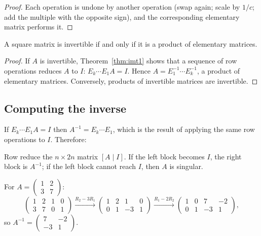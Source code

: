 \begin{proof}
Each operation is undone by another operation (swap again; scale by $1/c$; add the multiple with the opposite sign), and the corresponding elementary matrix performs it.
\end{proof}

\begin{theorem}[Invertible = product of elementary matrices]\label{thm:elemprod}
A square matrix is invertible if and only if it is a product of elementary matrices.
\end{theorem}

\begin{proof}
If $A$ is invertible, Theorem~\ref{thm:imt1} shows that a sequence of row operations reduces $A$ to $I$: $E_k\cdots E_1A=I$. Hence $A=E_1^{-1}\cdots E_k^{-1}$, a product of elementary matrices. Conversely, products of invertible matrices are invertible.
\end{proof}

\subsection*{Computing the inverse}

If $E_k\cdots E_1A=I$ then $A^{-1}=E_k\cdots E_1$, which is the result of applying the same row operations to $I$. Therefore:

\begin{theorem}
Row reduce the $n\times 2n$ matrix $[A\mid I]$. If the left block becomes $I$, the right block is $A^{-1}$; if the left block cannot reach $I$, then $A$ is singular.
\end{theorem}

\begin{example}
For $A=\begin{pmatrix}1&2\\3&7\end{pmatrix}$:
\[
\begin{pmatrix}1&2&1&0\\3&7&0&1\end{pmatrix}\xrightarrow{R_2-3R_1}\begin{pmatrix}1&2&1&0\\0&1&-3&1\end{pmatrix}\xrightarrow{R_1-2R_2}\begin{pmatrix}1&0&7&-2\\0&1&-3&1\end{pmatrix},
\]
so $A^{-1}=\begin{pmatrix}7&-2\\-3&1\end{pmatrix}$.
\end{example}

